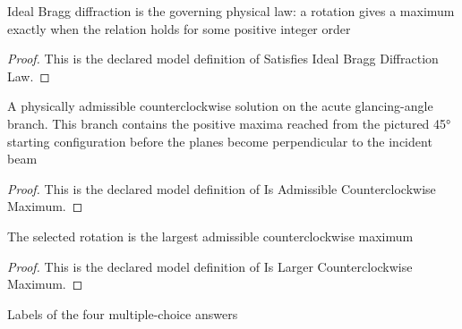 \begin{definition}
  \label{def:physics:phyx-mini-0079:phyxminiproblems-problemphyxmini0079-satisfiesidealbraggdiffractionlaw}
  Ideal Bragg diffraction is the governing physical law: a rotation gives a maximum exactly when the relation holds for some positive integer order
\end{definition}
\begin{proof}
  This is the declared model definition of Satisfies Ideal Bragg Diffraction Law.
\end{proof}
\begin{definition}
  \label{def:physics:phyx-mini-0079:phyxminiproblems-problemphyxmini0079-isadmissiblecounterclockwisemaximum}
  A physically admissible counterclockwise solution on the acute glancing-angle branch. This branch contains the positive maxima reached from the pictured 45° starting configuration before the planes become perpendicular to the incident beam
\end{definition}
\begin{proof}
  This is the declared model definition of Is Admissible Counterclockwise Maximum.
\end{proof}
\begin{definition}
  \label{def:physics:phyx-mini-0079:phyxminiproblems-problemphyxmini0079-islargercounterclockwisemaximum}
  The selected rotation is the largest admissible counterclockwise maximum
\end{definition}
\begin{proof}
  This is the declared model definition of Is Larger Counterclockwise Maximum.
\end{proof}
\begin{definition}
  \label{def:physics:phyx-mini-0079:phyxminiproblems-problemphyxmini0079-answerchoice}
  Labels of the four multiple-choice answers
\end{definition}
